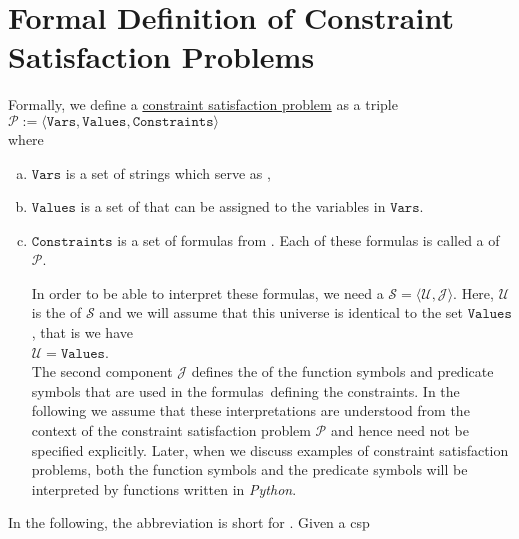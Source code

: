 \section[Formal Definition of \textsc{Csp}s]{Formal Definition of Constraint Satisfaction Problems}
Formally, we define a 
\href{https://en.wikipedia.org/wiki/Constraint_satisfaction_problem}{constraint satisfaction problem} as a triple
\\[0.2cm]
\hspace*{1.3cm}
$\mathcal{P} := \langle \texttt{Vars}, \texttt{Values}, \texttt{Constraints} \rangle$
\\[0.2cm]
where 
\begin{enumerate}[(a)]
\item $\texttt{Vars}$ is a set of strings which serve as ,
\item $\texttt{Values}$ is a set of  that can be assigned to the variables in $\texttt{Vars}$.
\item $\texttt{Constraints}$ is a set of formulas from .  Each of these formulas is
      called a  of $\mathcal{P}$.

      In order to be able to interpret these formulas, we need a  $\mathcal{S} = \langle \mathcal{U}, \mathcal{J} \rangle$.  
      Here, $\mathcal{U}$ is the  of $\mathcal{S}$ and we will assume that this
      universe is identical to the set $\texttt{Values}$, that is we have
      \\[0.2cm]
      \hspace*{1.3cm}
      $\mathcal{U} = \texttt{Values}$.
      \\[0.2cm]
      The second component $\mathcal{J}$ defines the
       of the function symbols and predicate symbols that are used in the formulas\
      defining the constraints.  In the following we assume that these interpretations are understood from the
      context of the constraint satisfaction problem $\mathcal{P}$ and hence need not be specified explicitly.
      Later, when we discuss examples of constraint 
      satisfaction problems, both the function symbols and the predicate symbols will be interpreted
      by functions written in \textsl{Python}.
\end{enumerate}
In the following, the abbreviation  is short for .
Given a \ac{csp}
\\[0.2cm]
\hspace*{1.3cm}

